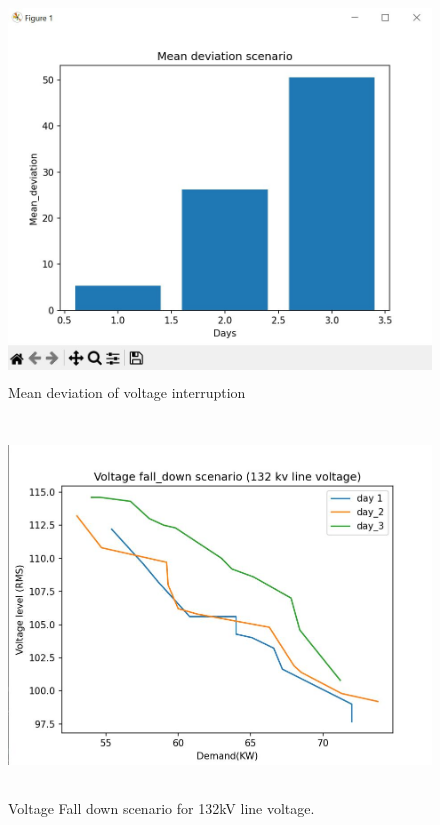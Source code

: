 \documentclass[a4paper,12pt,oneside]{book}
\begin{document}
  \newpage
  \begin{figure}[h!]
    \centering
    \includegraphics[height=10cm]{Figures/4.jpg} 
    \caption{Mean deviation of voltage interruption}
    \label{fig:mean-deviation}
  \end{figure}

  \begin{figure}[h!]
    \centering
    \includegraphics[height=10cm]{Figures/5.jpg} 
    \caption{Voltage Fall down scenario for 132kV line voltage.}
    \label{fig:voltage-drops}
      \end{figure}

\newpage\newpage\newpage
\end{document}
